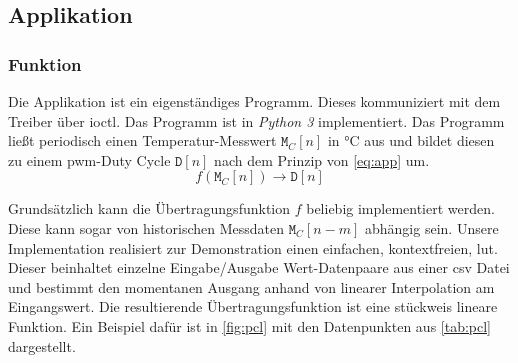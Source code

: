 \subsection{Applikation}

\subsubsection{Funktion}

Die Applikation ist ein eigenständiges Programm.
Dieses kommuniziert mit dem Treiber über \gls{ioctl}.
Das Programm ist in \textit{Python 3} implementiert.
Das Programm ließt periodisch einen Temperatur-Messwert $\texttt{M}_C[n]$ in \si{\celsius} aus und bildet diesen zu einem \gls{pwm}-Duty Cycle $\texttt{D}[n]$ nach dem Prinzip von \autoref{eq:app} um.
\begin{equation}
    f \left( \texttt{M}_C \left[n\right] \right) \rightarrow \texttt{D}\left[n\right]
    \label{eq:app}
\end{equation}

Grundsätzlich kann die Übertragungsfunktion $f$ beliebig implementiert werden.
Diese kann sogar von historischen Messdaten $\texttt{M}_C[n-m]$ abhängig sein.
Unsere Implementation realisiert zur Demonstration einen einfachen, kontextfreien, \gls{lut}.
Dieser beinhaltet einzelne Eingabe/Ausgabe Wert-Datenpaare aus einer \gls{csv} Datei und bestimmt den momentanen Ausgang anhand von linearer Interpolation am Eingangswert.
Die resultierende Übertragungsfunktion ist eine stückweis lineare Funktion.
Ein Beispiel dafür ist in \autoref{fig:pcl} mit den Datenpunkten aus \autoref{tab:pcl} dargestellt.

